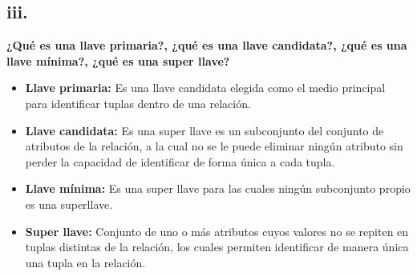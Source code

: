 \subsection*{iii.}


\textbf{¿Qué es una llave primaria?, ¿qué es una llave candidata?, ¿qué es una llave mínima?, ¿qué es una
super llave?}

\begin{itemize}
    \item \textbf{Llave primaria:} Es una llave candidata elegida como el medio principal para identificar tuplas dentro de una relación.
    \item \textbf{Llave candidata:} Es una super llave es un subconjunto del conjunto de atributos de la relación, a la cual no se le puede eliminar ningún atributo sin perder la capacidad de identificar de forma única a cada tupla.
    \item \textbf{Llave mínima:} Es una super llave para las cuales ningún subconjunto propio es una superllave.
    \item  \textbf{Super llave:} Conjunto de uno o más atributos cuyos valores no se repiten en tuplas distintas de la relación, los cuales permiten identificar de manera única una tupla en la relación.
\end{itemize}